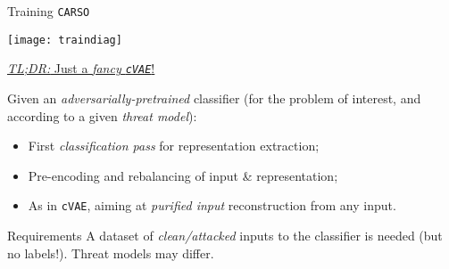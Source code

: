 
\begin{frame}{ Training \texttt{CARSO}}
    \begin{minipage}[]{0.5\textwidth}
        \vspace{0px}
        \texttt{[image: traindiag]}
    \end{minipage}
    \begin{minipage}[]{0.45\textwidth}
        \vspace{0pt}

        \begin{center}
            \underline{\textit{TL;DR:} Just a \textit{fancy \texttt{cVAE}}!}
        \end{center}

        Given an \textit{\alert{adversarially}-pretrained} classifier (for the problem of interest, and according to a given \textit{\alert{threat model}}):
        \hfill\break
        \begin{itemize}
            \item First \textit{classification pass} for representation \alert{extraction};
            \item Pre-encoding and \alert{rebalancing} of input \& representation;
            \item As in \texttt{cVAE}, aiming at \textit{\alert{purified} input} reconstruction from any input.
        \end{itemize}

    \begin{block}{Requirements}
        A dataset of \textit{clean/attacked} inputs to the classifier is needed (but \alert{no labels}!). Threat models may differ.
    \end{block}

    \end{minipage}
\end{frame}

